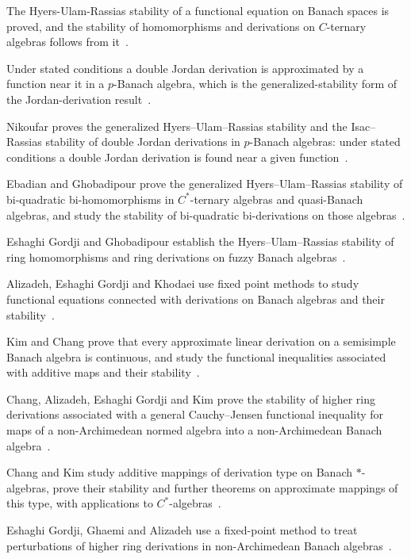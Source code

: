 The Hyers-Ulam-Rassias stability of a functional equation on Banach spaces is proved, and the stability of homomorphisms and derivations on $C$-ternary algebras follows from it~\cite{WlStabilityOfHomomorphismsAndDer2019}.

Under stated conditions a double Jordan derivation is approximated by a function near it in a $p$-Banach algebra, which is the generalized-stability form of the Jordan-derivation result~\cite{WlFunctionsNearSomeDoubleJordanD2019}.

Nikoufar proves the generalized Hyers--Ulam--Rassias stability and the Isac--Rassias stability of double Jordan derivations in $p$-Banach algebras: under stated conditions a double Jordan derivation is found near a given function~\cite{WlFunctionsNearSomeAlpha1Alpha2D2017}.

Ebadian and Ghobadipour prove the generalized Hyers--Ulam--Rassias stability of bi-quadratic bi-homomorphisms in $C^*$-ternary algebras and quasi-Banach algebras, and study the stability of bi-quadratic bi-derivations on those algebras~\cite{WlOnApproximateBiQuadraticBiHomo2012}.

Eshaghi Gordji and Ghobadipour establish the Hyers--Ulam--Rassias stability of ring homomorphisms and ring derivations on fuzzy Banach algebras~\cite{WlFuzzyStabilityOfRingHomomorphi2009}.

Alizadeh, Eshaghi Gordji and Khodaei use fixed point methods to study functional equations connected with derivations on Banach algebras and their stability~\cite{WlFixedPointsAndFunctionalEquati2012}.

Kim and Chang prove that every approximate linear derivation on a semisimple Banach algebra is continuous, and study the functional inequalities associated with additive maps and their stability~\cite{WlApproximateLinearDerivationsAn2012}.

Chang, Alizadeh, Eshaghi Gordji and Kim prove the stability of higher ring derivations associated with a general Cauchy--Jensen functional inequality for maps of a non-Archimedean normed algebra into a non-Archimedean Banach algebra~\cite{WlApproximateHigherRingDerivatio2015}.

Chang and Kim study additive mappings of derivation type on Banach $*$-algebras, prove their stability and further theorems on approximate mappings of this type, with applications to $C^*$-algebras~\cite{WlApproximateAdditiveMappingsOfD2022}.

Eshaghi Gordji, Ghaemi and Alizadeh use a fixed-point method to treat perturbations of higher ring derivations in non-Archimedean Banach algebras~\cite{WlAFixedPointMethodForPerturbati2011}.

